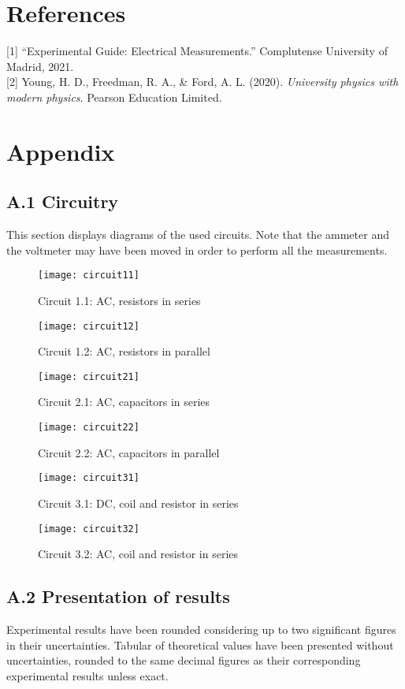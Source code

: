 \documentclass[a4paper, 12pt]{article}
\begin{document}
\section{References}
[1] “Experimental Guide: Electrical Measurements.” Complutense University of Madrid, 2021. \\

[2] Young, H. D., Freedman, R. A., \& Ford, A. L. (2020). \textit{University physics with modern physics}. Pearson Education Limited. 
\newpage


\section{Appendix}
\subsection{A.1 Circuitry}
This section displays diagrams of the used circuits. Note that the ammeter and the voltmeter may have been moved in order to perform all the measurements. 
\begin{figure}[hbt!]
	\centering
	\texttt{[image: circuit11]}
	\caption{Circuit 1.1: AC, resistors in series}
\end{figure}
\begin{figure}[hbt!]
	\centering
	\texttt{[image: circuit12]}
	\caption{Circuit 1.2: AC, resistors in parallel}
\end{figure}
\begin{figure}[hbt!]
	\centering
	\texttt{[image: circuit21]}
	\caption{Circuit 2.1: AC, capacitors in series}
\end{figure}
\begin{figure}[hbt!]
	\centering
	\texttt{[image: circuit22]}
	\caption{Circuit 2.2: AC, capacitors in parallel}
\end{figure}
\begin{figure}[hbt!]
	\centering
	\texttt{[image: circuit31]}
	\caption{Circuit 3.1: DC, coil and resistor in series}
\end{figure}
\begin{figure}[hbt!]
	\centering
	\texttt{[image: circuit32]}
	\caption{Circuit 3.2: AC, coil and resistor in series}
\end{figure}
\subsection{A.2 Presentation of results}
Experimental results have been rounded considering up to two significant figures in their uncertainties. Tabular of theoretical values have been presented without uncertainties, rounded to the same decimal figures as their corresponding experimental results unless exact.\\
\end{document}
